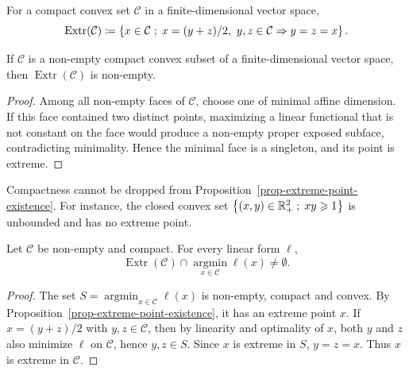 \begin{defn}\label{def-extreme-points}
	For a compact convex set $\mathcal C$ in a finite-dimensional vector space,
	\[
		\operatorname{Extr}(\mathcal C)
		\coloneqq
		\left\{ x\in\mathcal C \;;\; x=(y+z)/2,\ y,z\in\mathcal C \Rightarrow y=z=x \right\}.
	\]
\end{defn}

\begin{prop}\label{prop-extreme-point-existence}
	If $\mathcal C$ is a non-empty compact convex subset of a finite-dimensional vector space, then $\operatorname{Extr}(\mathcal C)$ is non-empty.
\end{prop}
\begin{proof}
	Among all non-empty faces of $\mathcal C$, choose one of minimal affine dimension. If this face contained two distinct points, maximizing a linear functional that is not constant on the face would produce a non-empty proper exposed subface, contradicting minimality. Hence the minimal face is a singleton, and its point is extreme.
\end{proof}

\begin{example}
	Compactness cannot be dropped from Proposition~\ref{prop-extreme-point-existence}. For instance, the closed convex set $\left\{ (x,y)\in\mathbb{R}_+^2 \;;\; xy\geqslant1 \right\}$ is unbounded and has no extreme point.
\end{example}

\begin{prop}\label{prop-linear-program-extreme-minimizer}
	Let $\mathcal C$ be non-empty and compact. For every linear form $\ell$,
	\[
		\operatorname{Extr}(\mathcal C)\cap\operatorname*{argmin}_{x\in\mathcal C}\ell(x)
		\neq\emptyset.
	\]
\end{prop}
\begin{proof}
	The set $S=\operatorname*{argmin}_{x\in\mathcal C}\ell(x)$ is non-empty, compact and convex. By Proposition~\ref{prop-extreme-point-existence}, it has an extreme point $x$. If $x=(y+z)/2$ with $y,z\in\mathcal C$, then by linearity and optimality of $x$, both $y$ and $z$ also minimize $\ell$ on $\mathcal C$, hence $y,z\in S$. Since $x$ is extreme in $S$, $y=z=x$. Thus $x$ is extreme in $\mathcal C$.
\end{proof}

